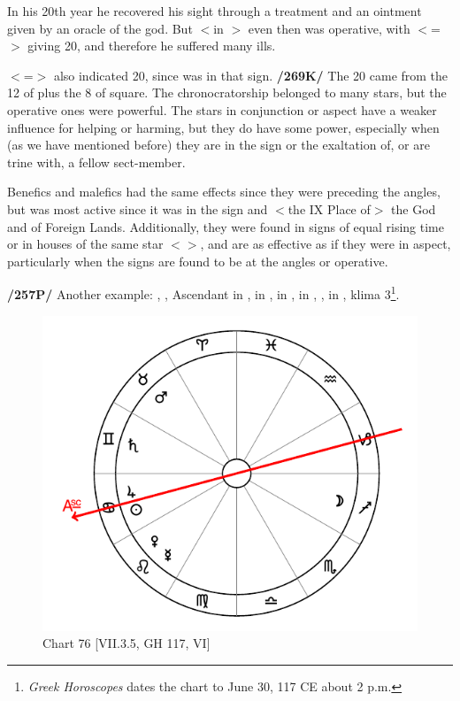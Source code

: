 In his 20th year he recovered his sight through a treatment and an ointment given by an oracle of the god. But \Saturn\xspace $<$in
\Gemini$>$ even then was operative, with \Gemini\xspace $<$=\Mercury$>$ giving 20, and therefore he suffered many ills.

\Virgo $<$=\Mercury$>$ also indicated 20, since \Jupiter was in that sign. \textbf{/269K/} The 20 came from the 12 of \Jupiter\xspace plus the 8 of \Venus\xspace square. The chronocratorship belonged to many stars, but the operative ones were powerful. The stars in conjunction or aspect have a weaker influence for helping or harming, but they do have some power, especially when (as we have mentioned before) they are in the sign or the exaltation of, or are trine with, a fellow sect-member. 

Benefics and malefics had the same effects since they were preceding the angles, but \Jupiter\xspace was most active since it was in the sign and $<$the IX Place of$>$ the God and of Foreign Lands. Additionally, they were found in signs of equal rising time or in houses of the same star $<$\Mercury$>$, and are as effective as if they were in aspect, particularly when the signs are found to be at
the angles or operative.

\textbf{/257P/} Another example: \Sun, \Jupiter, Ascendant in \Cancer, \Moon\xspace in \Sagittarius, \Saturn\xspace in \Gemini,
\Mars\xspace in \Taurus, \Venus, \Mercury\xspace in \Leo, klima 3\footnote{\textit{Greek Horoscopes} dates the chart to June 30, 117 CE about 2 p.m.}.

\begin{figure}
\centering
\vspace{-20pt}
\includegraphics[width=.68\textwidth]{charts/7_3_5}
\caption{Chart 76 [VII.3.5, GH 117, VI]}
\label{fig:chart76}
\end{figure} 

